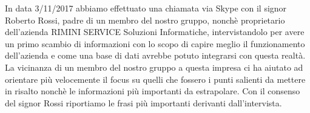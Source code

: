 
In data 3/11/2017 abbiamo effettuato una chiamata via Skype con il signor Roberto Rossi, padre di un membro del nostro gruppo, nonchè proprietario dell'azienda RIMINI SERVICE Soluzioni Informatiche, intervistandolo per avere un primo scambio di informazioni con lo scopo di capire meglio il funzionamento dell'azienda e come una base di dati avrebbe potuto integrarsi con questa realtà. \newline
La vicinanza di un membro del nostro gruppo a questa impresa ci ha aiutato ad orientare più velocemente il focus su quelli che fossero i punti salienti da mettere in risalto nonchè le informazioni più importanti da estrapolare. \newline
Con il consenso del signor Rossi riportiamo le frasi più importanti derivanti dall'intervista. 

